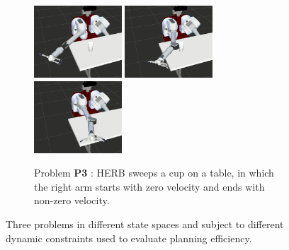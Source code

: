 \documentclass[letterpaper, 10 pt, conference]{ieeeconf}  %
\begin{document}
\begin{figure}[t!]
\begin{subfigure}[b]{\textwidth}
    \includegraphics[height=2.7cm]{fig/planning_efficiency/herb_batting_3}
    \includegraphics[height=2.7cm]{fig/planning_efficiency/herb_batting_4}
    \includegraphics[height=2.7cm]{fig/planning_efficiency/herb_batting_5}
	\caption{Problem \textbf{P3} : HERB sweeps a cup on a table, in which the right arm starts with zero velocity and ends with non-zero velocity.}
	\label{fig:planning_efficiency:herb:example}
	\end{subfigure}
	\caption{\captionstyle Three problems in different state spaces and subject to different dynamic constraints used to evaluate planning efficiency.}
	\label{fig:problems}
\end{figure} 
\end{document}
